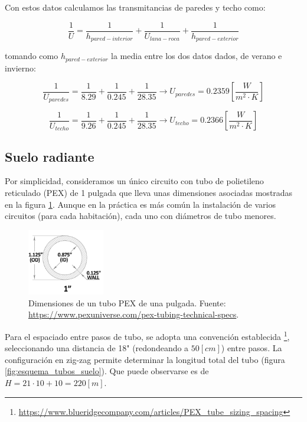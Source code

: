 Con estos datos calculamos las transmitancias de paredes y techo como:

\begin{equation}
	\frac{1}{U} = \frac{1}{h_{pared-interior}} + \frac{1}{U_{lana-roca}} + \frac{1}{h_{pared-exterior}}
\end{equation}

tomando como $h_{pared-exterior}$ la media entre los dos datos dados, de verano
e invierno:

\begin{equation}
	\frac{1}{U_{paredes}} = \frac{1}{8.29} + \frac{1}{0.245} + \frac{1}{28.35} \rightarrow U_{paredes} = 0.2359 \left[\frac{W}{m^2 \cdot K}\right]
\end{equation}

\begin{equation}
	\frac{1}{U_{techo}} = \frac{1}{9.26} + \frac{1}{0.245} + \frac{1}{28.35} \rightarrow U_{techo} = 0.2366 \left[\frac{W}{m^2 \cdot K}\right]
\end{equation}


\subsection{Suelo radiante}

Por simplicidad, consideramos un único circuito con tubo de polietileno reticulado (PEX) de 1
pulgada que lleva unas dimensiones asociadas mostradas en la figura
\ref{fig:1_inch_pex}.
Aunque en la práctica es más común la instalación de varios circuitos (para
cada habitación), cada uno con diámetros de tubo menores.

\begin{figure}[h] \centering
	\centering
	\includegraphics[width=0.3\textwidth]{./capitulos/resultados_discusion/images/1_inch_pex.png}
	\caption{Dimensiones de un tubo PEX de una pulgada. Fuente: \url{https://www.pexuniverse.com/pex-tubing-technical-specs}.}
	\label{fig:1_inch_pex}
\end{figure}


Para el espaciado entre pasos de tubo, se adopta una convención establecida
\footnote{\url{https://www.blueridgecompany.com/articles/PEX_tube_sizing_spacing}},
seleccionando una distancia de 18" (redondeando a $50[cm]$) entre pasos. La
configuración en zig-zag permite determinar la longitud total del tubo (figura
\ref{fig:esquema_tubos_suelo}). Que puede observarse es de $H = 21 \cdot 10 + 10 =
220[m]$.

